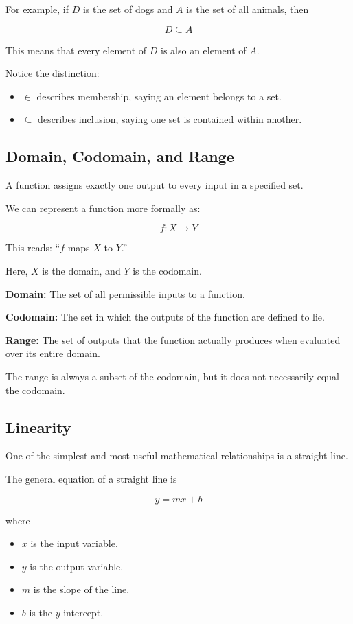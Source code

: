 \documentclass[12pt]{article}
\begin{document}
For example, if $D$ is the set of dogs and $A$ is the set of all animals, then

\[
D\subseteq A
\]

This means that every element of $D$ is also an element of $A$. 

Notice the distinction:
\begin{itemize}
    \item $\in$ describes membership, saying an element belongs to a set.
    \item $\subseteq$ describes inclusion, saying one set is contained within another.
\end{itemize}

\subsection{Domain, Codomain, and Range}

A function assigns exactly one output to every input in a specified set.

We can represent a function more formally as:

\[
f:X\rightarrow Y
\]

This reads: ``$f$ maps $X$ to $Y$.''

Here, $X$ is the domain, and $Y$ is the codomain.

\textbf{Domain:} The set of all permissible inputs to a function.

\textbf{Codomain:} The set in which the outputs of the function are defined to lie.

\textbf{Range:} The set of outputs that the function actually produces when evaluated over its entire domain.

The range is always a subset of the codomain, but it does not necessarily equal the codomain.

\subsection{Linearity}

One of the simplest and most useful mathematical relationships is a straight line.

The general equation of a straight line is

\[
\boxed{y=mx+b}
\]

where

\begin{itemize}
    \item $x$ is the input variable.
    \item $y$ is the output variable.
    \item $m$ is the slope of the line.
    \item $b$ is the $y$-intercept.
\end{itemize}
\end{document}

